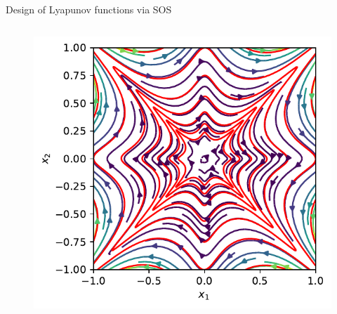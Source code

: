 \documentclass[aspectratio=169]{beamer}
\begin{document}
\begin{frame}{Design of Lyapunov functions via SOS
\href{https://colab.research.google.com/github/TobiaMarcucci/optimal_control_pisa/blob/master/demos/lyapunov_poly.ipynb}{}}
\begin{columns}
\begin{figure}
\includegraphics[width=\columnwidth]{figures/lyapunov_poly_2.pdf}
\end{figure}
\end{columns}
\end{frame}
\end{document}

